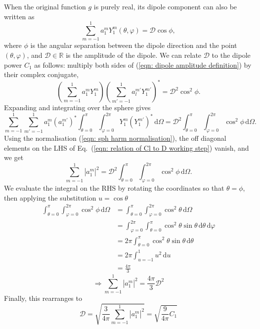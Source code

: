\documentclass[a4paper,12pt]{report}
\newcommand{\diff}[1]{\,\text{d}{#1}}
\newcommand{\sphint}[1]{\int_{\theta=0}^\pi \int_{\varphi=0}^{2\pi} #1 \diff{\Omega}}
\renewcommand{\eqref}[1]{Eq.~({#1})}
\begin{document}
When the original function $g$ is purely real, its dipole component can also be written as
\begin{equation} \label{eqn: dipole amplitude definition}
  \sum_{m=-1}^1 a^m_1 Y^m_1 (\theta, \varphi) = \mathcal{D} \cos\phi,
\end{equation}
where $\phi$ is the angular separation between the dipole direction and the point $(\theta, \varphi)$, and $\mathcal{D} \in \mathbb{R}$ is the amplitude of the dipole. We can relate $\mathcal{D}$ to the dipole power $C_1$ as follows: multiply both sides of (\ref{eqn: dipole amplitude definition}) by their complex conjugate,
\begin{equation}
  \left(\sum_{m=-1}^1 a^m_1 Y^m_1\right)\left(\sum_{m'=-1}^1 a^{m'}_l Y^{m'}_1\right)^* = \mathcal{D}^2 \cos^2\phi.
\end{equation}
Expanding and integrating over the sphere gives
\begin{equation}\label{eqn: relation of Cl to D working step}
  \sum_{m=-1}^1 \sum_{m'=-1}^1 a^m_1 (a^{m'}_1)^* \sphint{Y^m_1 (Y^{m'}_1)^*} = \mathcal{D}^2 \sphint{\cos^2\phi}.
\end{equation}
Using the normalisation (\ref{eqn: sph harm normalisation}), the off diagonal elements on the LHS of \eqref{\ref{eqn: relation of Cl to D working step}} vanish, and we get
\begin{equation}
  \sum_{m=-1}^1 |a^m_1|^2 = \mathcal{D}^2 \sphint{\cos^2\phi}.
\end{equation}
We evaluate the integral on the RHS by rotating the coordinates so that $\theta = \phi$, then applying the substitution $u = \cos\theta$
\begin{align*}
   \sphint{\cos^2\phi} &= \sphint{\cos^2\theta}\\
                       &= \int_{\varphi=0}^{2\pi}  \int_{\theta=0}^\pi \cos^2\theta \sin\theta \diff{\theta} \diff{\varphi}\\
                       &= 2\pi \int_{\theta=0}^\pi \cos^2\theta \sin\theta \diff{\theta}\\
                       &= 2\pi \int_{u=-1}^{1} u^2 \diff{u}\\
                       &= \frac{4\pi}{3}
\end{align*}
\begin{equation}
  \Longrightarrow\sum_{m=-1}^1 |a^m_1|^2 = \frac{4\pi}{3} \mathcal{D}^2
\end{equation}
Finally, this rearranges to
\begin{equation} \label{eqn: dipole amplitude from power}
  \mathcal{D} = \sqrt{\frac{3}{4\pi}\sum_{m=-1}^{1}|a^m_1|^2} = \sqrt{\frac{9}{4\pi}C_1}
\end{equation}
\end{document}
